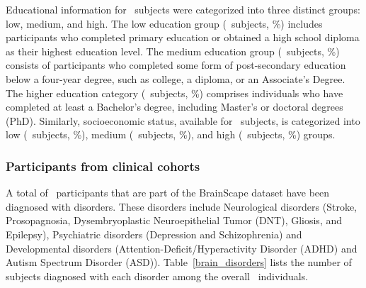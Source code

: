 Educational information for \TotalSubjectsWithEducationCount\ subjects were categorized into three distinct groups: low, medium, and high. 
The low education group (\TotalSubjectsWithLowEducationCount\ subjects, \TotalSubjectsWithLowEducationPercentage\%) includes participants 
who completed primary education or obtained a high school diploma as their highest education level. 
The medium education group (\TotalSubjectsWithMediumEducationCount\ subjects, \TotalSubjectsWithMediumEducationPercentage\%) consists 
of participants who completed some form of post-secondary education below a four-year degree, such as college, a diploma, or an Associate's Degree. 
The higher education category (\TotalSubjectsWithHighEducationCount\ subjects, \TotalSubjectsWithHighEducationPercentage\%) comprises individuals 
who have completed at least a Bachelor's degree, including Master's or doctoral degrees (PhD). 
Similarly, socioeconomic status, available for \TotalSubjectsWithSocioEconomicCount\ subjects, is categorized into 
low (\TotalSubjectsWithLowEconomicCount\ subjects, \TotalSubjectsWithLowEconomicPercentage\%), 
medium (\TotalSubjectsWithMediumEconomicCount\ subjects, \TotalSubjectsWithMediumEconomicPercentage\%), and high (\TotalSubjectsWithHighEconomicCount\ subjects, 
\TotalSubjectsWithHighEconomicPercentage\%) groups.


\subsubsection{Participants from clinical cohorts}

A total of \TotalSubjectsWithDisordersCount\ participants that are part of the BrainScape dataset have been diagnosed with disorders.
These disorders include Neurological disorders (Stroke, Prosopagnosia, Dysembryoplastic Neuroepithelial Tumor (DNT), Gliosis, and Epilepsy), Psychiatric disorders (Depression and Schizophrenia)
and Developmental disorders (Attention-Deficit/Hyperactivity Disorder (ADHD) and Autism Spectrum Disorder (ASD)). 
Table~\ref{brain_disorders} lists the number of subjects diagnosed with each disorder among 
the overall \TotalSubjectsIncludedAfterInspectionCount\ individuals. 

